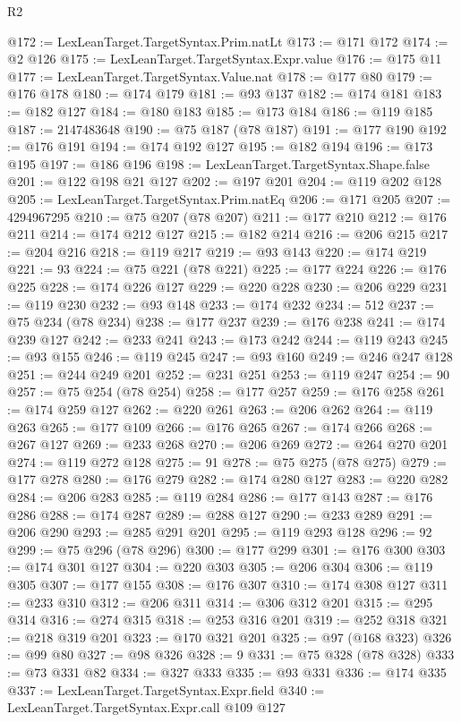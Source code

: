 \begin{lexlean}{R2}
\begin{coremodule}
@172 := LexLeanTarget.TargetSyntax.Prim.natLt
@173 := @171 @172
@174 := @2 @126
@175 := LexLeanTarget.TargetSyntax.Expr.value
@176 := @175 @11
@177 := LexLeanTarget.TargetSyntax.Value.nat
@178 := @177 @80
@179 := @176 @178
@180 := @174 @179
@181 := @93 @137
@182 := @174 @181
@183 := @182 @127
@184 := @180 @183
@185 := @173 @184
@186 := @119 @185
@187 := 2147483648
@190 := @75 @187 (@78 @187)
@191 := @177 @190
@192 := @176 @191
@194 := @174 @192 @127
@195 := @182 @194
@196 := @173 @195
@197 := @186 @196
@198 := LexLeanTarget.TargetSyntax.Shape.false
@201 := @122 @198 @21 @127
@202 := @197 @201
@204 := @119 @202 @128
@205 := LexLeanTarget.TargetSyntax.Prim.natEq
@206 := @171 @205
@207 := 4294967295
@210 := @75 @207 (@78 @207)
@211 := @177 @210
@212 := @176 @211
@214 := @174 @212 @127
@215 := @182 @214
@216 := @206 @215
@217 := @204 @216
@218 := @119 @217
@219 := @93 @143
@220 := @174 @219
@221 := 93
@224 := @75 @221 (@78 @221)
@225 := @177 @224
@226 := @176 @225
@228 := @174 @226 @127
@229 := @220 @228
@230 := @206 @229
@231 := @119 @230
@232 := @93 @148
@233 := @174 @232
@234 := 512
@237 := @75 @234 (@78 @234)
@238 := @177 @237
@239 := @176 @238
@241 := @174 @239 @127
@242 := @233 @241
@243 := @173 @242
@244 := @119 @243
@245 := @93 @155
@246 := @119 @245
@247 := @93 @160
@249 := @246 @247 @128
@251 := @244 @249 @201
@252 := @231 @251
@253 := @119 @247
@254 := 90
@257 := @75 @254 (@78 @254)
@258 := @177 @257
@259 := @176 @258
@261 := @174 @259 @127
@262 := @220 @261
@263 := @206 @262
@264 := @119 @263
@265 := @177 @109
@266 := @176 @265
@267 := @174 @266
@268 := @267 @127
@269 := @233 @268
@270 := @206 @269
@272 := @264 @270 @201
@274 := @119 @272 @128
@275 := 91
@278 := @75 @275 (@78 @275)
@279 := @177 @278
@280 := @176 @279
@282 := @174 @280 @127
@283 := @220 @282
@284 := @206 @283
@285 := @119 @284
@286 := @177 @143
@287 := @176 @286
@288 := @174 @287
@289 := @288 @127
@290 := @233 @289
@291 := @206 @290
@293 := @285 @291 @201
@295 := @119 @293 @128
@296 := 92
@299 := @75 @296 (@78 @296)
@300 := @177 @299
@301 := @176 @300
@303 := @174 @301 @127
@304 := @220 @303
@305 := @206 @304
@306 := @119 @305
@307 := @177 @155
@308 := @176 @307
@310 := @174 @308 @127
@311 := @233 @310
@312 := @206 @311
@314 := @306 @312 @201
@315 := @295 @314
@316 := @274 @315
@318 := @253 @316 @201
@319 := @252 @318
@321 := @218 @319 @201
@323 := @170 @321 @201
@325 := @97 (@168 @323)
@326 := @99 @80
@327 := @98 @326
@328 := 9
@331 := @75 @328 (@78 @328)
@333 := @73 @331 @82
@334 := @327 @333
@335 := @93 @331
@336 := @174 @335
@337 := LexLeanTarget.TargetSyntax.Expr.field
@340 := LexLeanTarget.TargetSyntax.Expr.call @109 @127

\end{coremodule}
\end{lexlean}
